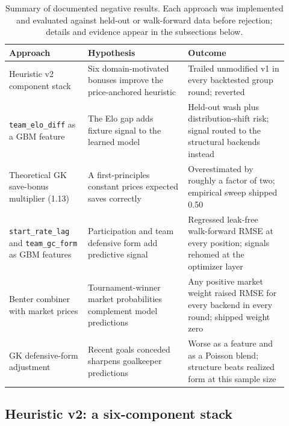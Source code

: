 \begin{table}[t]
  \centering
  \small
  \begin{tabular}{@{}p{0.26\linewidth}p{0.33\linewidth}p{0.33\linewidth}@{}}
    \toprule
    Approach & Hypothesis & Outcome \\
    \midrule
    Heuristic v2 component stack &
    Six domain-motivated bonuses improve the price-anchored heuristic &
    Trailed unmodified v1 in every backtested group round; reverted \\
    \addlinespace
    \texttt{team\_elo\_diff} as a GBM feature &
    The Elo gap adds fixture signal to the learned model &
    Held-out wash plus distribution-shift risk; signal routed to the
    structural backends instead \\
    \addlinespace
    Theoretical GK save-bonus multiplier (1.13) &
    A first-principles constant prices expected saves correctly &
    Overestimated by roughly a factor of two; empirical sweep
    shipped 0.50 \\
    \addlinespace
    \texttt{start\_rate\_lag} and \texttt{team\_gc\_form} as GBM
    features &
    Participation and team defensive form add predictive signal &
    Regressed leak-free walk-forward RMSE at every position; signals
    rehomed at the optimizer layer \\
    \addlinespace
    Benter combiner with market prices &
    Tournament-winner market probabilities complement model
    predictions &
    Any positive market weight raised RMSE for every backend in every
    round; shipped weight zero \\
    \addlinespace
    GK defensive-form adjustment &
    Recent goals conceded sharpens goalkeeper predictions &
    Worse as a feature and as a Poisson blend; structure beats
    realized form at this sample size \\
    \bottomrule
  \end{tabular}
  \caption{Summary of documented negative results. Each approach was
    implemented and evaluated against held-out or walk-forward data
    before rejection; details and evidence appear in the subsections
    below.}
  \label{tab:negative-summary}
\end{table}

\subsection{Heuristic v2: a six-component stack}
\label{sec:negative-heuristic-v2}


